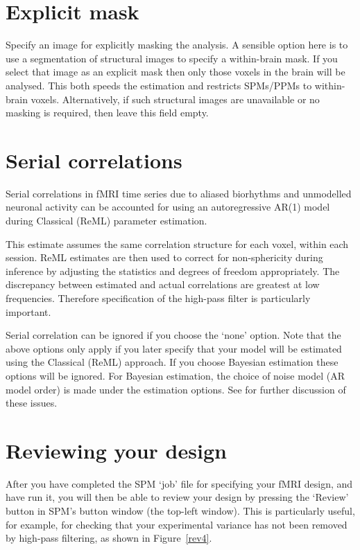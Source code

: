 \section{Explicit mask}
Specify an image for explicitly masking the analysis. A sensible option here is to use a segmentation of structural images to specify a within-brain mask. If you select that image as an explicit mask then only those voxels in the brain will be analysed. This both speeds the estimation and restricts SPMs/PPMs to within-brain voxels. Alternatively, if such structural images are unavailable or no masking is required, then leave this field empty.


\section{Serial correlations}
Serial correlations in fMRI time series due to aliased biorhythms and unmodelled neuronal activity can be accounted for using an autoregressive AR(1) model during Classical (ReML) parameter estimation.  

                                                                                                            

This estimate assumes the same correlation structure for each voxel, within each session.  ReML estimates are then used to correct for non-sphericity during inference by adjusting the statistics and degrees of freedom appropriately.  The discrepancy between estimated and actual correlations are greatest at low frequencies.  Therefore specification of the high-pass filter is particularly important. 

                                                                                                            

Serial correlation can be ignored if you choose the `none' option. Note that the above options only apply if you later specify that your model will be estimated using the Classical (ReML) approach. If you choose Bayesian estimation these options will be ignored. For Bayesian estimation, the choice of noise model (AR model order) is made under the estimation options. See \cite{peb1,vb_fmri_ar} for further discussion of 
these issues.

\section{Reviewing your design \label{explore}}

After you have completed the SPM `job' file for specifying your 
fMRI design, and have run it, you will then be able to review your 
design by pressing the `Review' button in SPM's button window (the 
top-left window). This is particularly useful, for example, for 
checking that your experimental variance has not been removed  
by high-pass filtering, as shown in Figure~\ref{rev4}.

